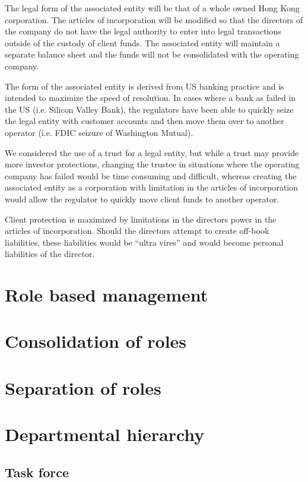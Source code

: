 The legal form of the associated entity will be that of a whole owned
Hong Kong corporation.  The articles of incorporation will be modified
so that the directors of the company do not have the legal authority
to enter into legal transactions outside of the custody of client
funds.  The associated entity will maintain a separate balance sheet
and the funds will not be consolidated with the operating company.

The form of the associated entity is derived from US banking practice
and is intended to maximize the speed of resolution.  In cases where a
bank as failed in the US (i.e. Silicon Valley Bank), the regulators
have been able to quickly seize the legal entity with customer
accounts and then move them over to another operator (i.e. FDIC
seizure of Washington Mutual).

We considered the use of a trust for a legal entity, but while a trust
may provide more investor protections, changing the trustee in
situations where the operating company has failed would be time
consuming and difficult, whereas creating the associated entity as a
corporation with limitation in the articles of incorporation would
allow the regulator to quickly move client funds to another operator.

Client protection is maximized by limitations in the directors power
in the articles of incorporation.  Should the directors attempt to
create off-book liabilities, these liabilities would be ``ultra
vires'' and would become personal liabilities of the director.

\section{Role based management}


\section{Consolidation of roles}

\section{Separation of roles}

\section{Departmental hierarchy}

\subsection{Task force}



